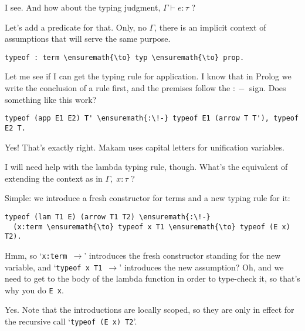\importantCodeblockEnd{}

\heroSTUDENT{} I see. And how about the typing judgment,
\(\Gamma \vdash e : \tau\) ?

\heroADVISOR{} Let's add a predicate for that. Only, no \(\Gamma\), there is
an implicit context of assumptions that will serve the same purpose.

\importantCodeblock{}

\begin{verbatim}
typeof : term \ensuremath{\to} typ \ensuremath{\to} prop.
\end{verbatim}

\importantCodeblockEnd{}

\heroSTUDENT{} Let me see if I can get the typing rule for application. I know
that in Prolog we write the conclusion of a rule first, and the premises
follow the \texttt{\ensuremath{:\!-}} sign. Does something like this work?

\importantCodeblock{}

\begin{verbatim}
typeof (app E1 E2) T' \ensuremath{:\!-} typeof E1 (arrow T T'), typeof E2 T.
\end{verbatim}

\importantCodeblockEnd{}

\heroADVISOR{} Yes! That's exactly right. Makam uses capital letters for
unification variables.

\heroSTUDENT{} I will need help with the lambda typing rule, though. What's
the equivalent of extending the context as in \(\Gamma, \; x : \tau\) ?

\heroADVISOR{} Simple: we introduce a fresh constructor for terms and a new
typing rule for it:

\importantCodeblock{}

\begin{verbatim}
typeof (lam T1 E) (arrow T1 T2) \ensuremath{:\!-}
  (x:term \ensuremath{\to} typeof x T1 \ensuremath{\to} typeof (E x) T2).
\end{verbatim}

\importantCodeblockEnd{}

\heroSTUDENT{} Hmm, so `\texttt{x:term\ \ensuremath{\to}}' introduces the fresh
constructor standing for the new variable, and
`\texttt{typeof\ x\ T1\ \ensuremath{\to}}' introduces the new assumption?
Oh, and we need to get to the body of the lambda function in order to
type-check it, so that's why you do \texttt{E\ x}.

\heroADVISOR{} Yes. Note that the introductions are locally scoped, so they
are only in effect for the recursive call `\texttt{typeof\ (E\ x)\ T2}'.

